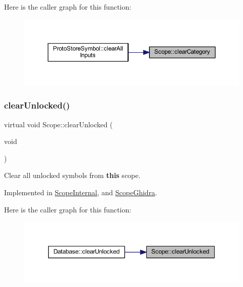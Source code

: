 Here is the caller graph for this function\+:
\nopagebreak
\begin{figure}[H]
\begin{center}
\leavevmode
\includegraphics[width=350pt]{class_scope_ab3c8275b6500a9cc620cc31f32ed267e_icgraph}
\end{center}
\end{figure}
\mbox{\label{class_scope_ac7d58385a87dca33d128300c666e5064}} 
\subsubsection{\texorpdfstring{clearUnlocked()}{clearUnlocked()}}
{\footnotesize\ttfamily virtual void Scope\+::clear\+Unlocked (\begin{DoxyParamCaption}\item[{void}]{ }\end{DoxyParamCaption})\hspace{0.3cm}{\ttfamily [pure virtual]}}



Clear all unlocked symbols from {\bfseries{this}} scope. 



Implemented in \mbox{\hyperlink{class_scope_internal_ab95e3712f0b536e014bfb3c8d3d2287a}{Scope\+Internal}}, and \mbox{\hyperlink{class_scope_ghidra_a32e0189b87b6c66641c7de9baf118457}{Scope\+Ghidra}}.

Here is the caller graph for this function\+:
\nopagebreak
\begin{figure}[H]
\begin{center}
\leavevmode
\includegraphics[width=350pt]{class_scope_ac7d58385a87dca33d128300c666e5064_icgraph}
\end{center}
\end{figure}
\mbox{\label{class_scope_a15fc66a463ca11a4c533991cea0639c8}} 
